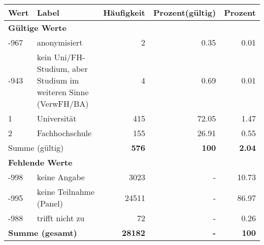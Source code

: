      \begin{longtable}{lXrrr}
     \toprule
     \textbf{Wert} & \textbf{Label} & \textbf{Häufigkeit} & \textbf{Prozent(gültig)} & \textbf{Prozent} \\
     \endhead
     \midrule
     \multicolumn{5}{l}{\textbf{Gültige Werte}}\\

     -967 &
     \multicolumn{1}{X}{ anonymisiert   } &


       \num{2} &
       \num[round-mode=places,round-precision=2]{0,35} &
         \num[round-mode=places,round-precision=2]{0,01} \\

     -943 &
     \multicolumn{1}{X}{ kein Uni/FH-Studium, aber Studium im weiteren Sinne (VerwFH/BA)   } &


       \num{4} &
       \num[round-mode=places,round-precision=2]{0,69} &
         \num[round-mode=places,round-precision=2]{0,01} \\

     1 &
     \multicolumn{1}{X}{ Universität   } &


       \num{415} &
       \num[round-mode=places,round-precision=2]{72,05} &
         \num[round-mode=places,round-precision=2]{1,47} \\

     2 &
     \multicolumn{1}{X}{ Fachhochschule   } &


       \num{155} &
       \num[round-mode=places,round-precision=2]{26,91} &
         \num[round-mode=places,round-precision=2]{0,55} \\
     \midrule
     \multicolumn{2}{l}{Summe (gültig)} &
       \textbf{\num{576}} &
     \textbf{100} &
       \textbf{\num[round-mode=places,round-precision=2]{2,04}} \\
     \multicolumn{5}{l}{\textbf{Fehlende Werte}}\\
       -998 &
       keine Angabe &
         \num{3023} &
        - &
         \num[round-mode=places,round-precision=2]{10,73} \\
       -995 &
       keine Teilnahme (Panel) &
         \num{24511} &
        - &
         \num[round-mode=places,round-precision=2]{86,97} \\
       -988 &
       trifft nicht zu &
         \num{72} &
        - &
         \num[round-mode=places,round-precision=2]{0,26} \\
     \midrule
     \multicolumn{2}{l}{\textbf{Summe (gesamt)}} &
          \textbf{\num{28182}} &
        \textbf{-} &
        \textbf{100} \\
     \bottomrule
     \end{longtable}
     
